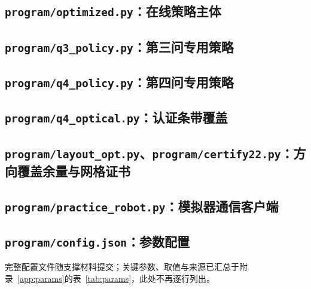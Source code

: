 \begin{appendices}
\subsection{\texttt{program/optimized.py}：在线策略主体}


\subsection{\texttt{program/q3\_policy.py}：第三问专用策略}


\subsection{\texttt{program/q4\_policy.py}：第四问专用策略}


\subsection{\texttt{program/q4\_optical.py}：认证条带覆盖}


\subsection{\texttt{program/layout\_opt.py}、\texttt{program/certify22.py}：方向覆盖余量与网格证书}



\subsection{\texttt{program/practice\_robot.py}：模拟器通信客户端}


\subsection{\texttt{program/config.json}：参数配置}

完整配置文件随支撑材料提交；关键参数、取值与来源已汇总于附录~\ref{app:params}的表~\ref{tab:params}，此处不再逐行列出。

\end{appendices}

